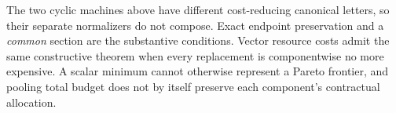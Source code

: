The two cyclic machines above have different cost-reducing canonical
letters, so their separate normalizers do not compose. Exact endpoint
preservation and a \emph{common} section are the substantive conditions.
Vector resource costs admit the same constructive theorem when every
replacement is componentwise no more expensive. A scalar minimum cannot
otherwise represent a Pareto frontier, and pooling total budget does not
by itself preserve each component's contractual allocation.
